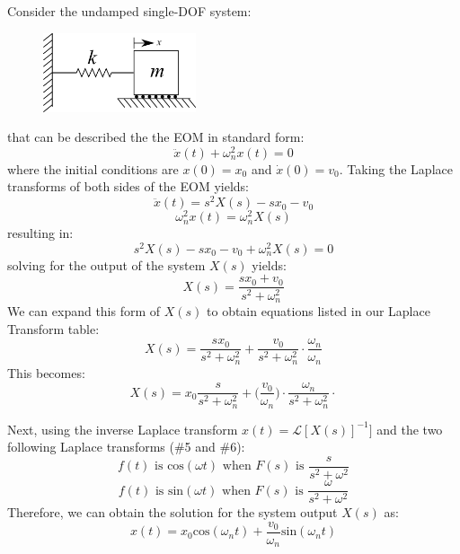 \documentclass[12pt,letter]{article}
\numberwithin{ex}{section} %
\newcommand{\Laplace}[1]{\ensuremath{\mathcal{L}{\left[#1\right]}}}
\begin{document}
Consider the undamped single-DOF system:
\begin{figure}[H]
	\centering
	\includegraphics[width=0.4\textwidth]{../Figures/1-DOF-mass_horizontal.png}
\end{figure}
that can be described the the EOM in standard form:
\begin{equation}
	\ddot{x}(t) + \omega_n^2x(t) = 0 
\end{equation}
where the initial conditions are $x(0)=x_0$ and $\dot{x}(0) = v_0$. Taking the Laplace transforms of both sides of the EOM yields:
\begin{equation}
	\ddot{x}(t)  = s^2X(s) -sx_0 -v_0
\end{equation}
\begin{equation}
	\omega_n^2x(t) = \omega_n^2X(s)
\end{equation}
resulting in:
\begin{equation}
	s^2X(s) -sx_0 -v_0 + \omega_n^2X(s) = 0
\end{equation}
solving for the output of the system $X(s)$ yields:
\begin{equation}
X(s) = \frac{sx_0 + v_0}{s^2 + \omega_n^2}
\end{equation}
We can expand this form of $X(s)$ to obtain equations listed in our Laplace Transform table:
\begin{equation}
X(s) = \frac{sx_0}{s^2 + \omega_n^2} + \frac{v_0}{s^2 + \omega_n^2}\cdot \frac{\omega_n}{\omega_n}
\end{equation}
This becomes:
\begin{equation}
X(s) = x_0\frac{s}{s^2 + \omega_n^2} + \bigg(\frac{v_0}{\omega_n}\bigg) \cdot \frac{\omega_n}{s^2 + \omega_n^2}\cdot 
\end{equation}

Next, using the inverse Laplace transform $x(t) = \Laplace{X(s)}^{-1}]$ and the two following Laplace transforms (\#5 and \#6):
\begin{equation}
f(t) \text{ is cos}(\omega t) \text{ when }  F(s) \text{ is } \frac{s}{s^2+\omega^2} 
\end{equation}
\begin{equation}
f(t) \text{ is sin}(\omega t)  \text{ when }  F(s) \text{ is } \frac{\omega}{s^2+\omega^2} 
\end{equation}
Therefore, we can obtain the solution for the system output $X(s)$ as:
\begin{equation}
x(t) = x_0 \text{cos}(\omega_n t) + \frac{v_0}{\omega_n}\text{sin}(\omega_n t)
\end{equation}
\end{document}
